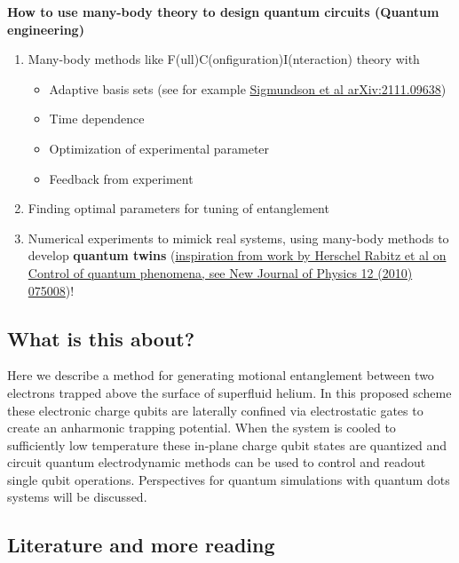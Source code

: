 \documentclass[%
oneside,                 %
final,                   %
10pt]{article}
\begin{document}
\textbf{How to use many-body theory to design quantum circuits (Quantum engineering)}
\begin{enumerate}
\item Many-body methods like F(ull)C(onfiguration)I(nteraction) theory  with
\begin{itemize}

  \item Adaptive basis sets (see for example \href{{https://arxiv.org/abs/2111.09638}}{Sigmundson et al arXiv:2111.09638})

  \item Time dependence

  \item Optimization of experimental parameter 

  \item Feedback from experiment

\end{itemize}

\noindent
\item Finding optimal parameters for tuning of entanglement

\item Numerical experiments to mimick real systems, using many-body methods to develop \textbf{quantum twins} (\href{{https://iopscience.iop.org/article/10.1088/1367-2630/12/7/075008}}{inspiration from  work by Herschel Rabitz et al on Control of quantum phenomena, see New Journal of Physics 12 (2010) 075008})!
\end{enumerate}

\noindent
\subsection{What is this about?}

Here we describe a method for generating motional entanglement between
two electrons trapped above the surface of superfluid helium. In this
proposed scheme these electronic charge qubits are laterally confined
via electrostatic gates to create an anharmonic trapping
potential. When the system is cooled to sufficiently low temperature
these in-plane charge qubit states are quantized and circuit quantum
electrodynamic methods can be used to control and readout single qubit
operations. Perspectives for quantum simulations with quantum dots
systems will be discussed.


\subsection{Literature and more reading}
\end{document}
